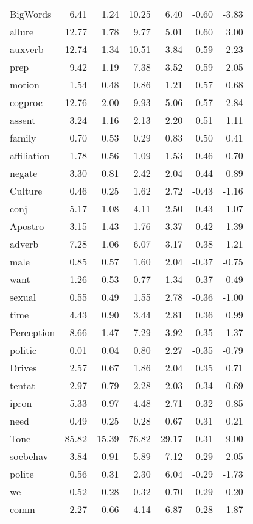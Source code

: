 \begin{longtable}{@{}p{3.4cm}rrrrrr@{}}
BigWords & 6.41 & 1.24 & 10.25 & 6.40 & -0.60 & -3.83 \\
allure & 12.77 & 1.78 & 9.77 & 5.01 & 0.60 & 3.00 \\
auxverb & 12.74 & 1.34 & 10.51 & 3.84 & 0.59 & 2.23 \\
prep & 9.42 & 1.19 & 7.38 & 3.52 & 0.59 & 2.05 \\
motion & 1.54 & 0.48 & 0.86 & 1.21 & 0.57 & 0.68 \\
cogproc & 12.76 & 2.00 & 9.93 & 5.06 & 0.57 & 2.84 \\
assent & 3.24 & 1.16 & 2.13 & 2.20 & 0.51 & 1.11 \\
family & 0.70 & 0.53 & 0.29 & 0.83 & 0.50 & 0.41 \\
affiliation & 1.78 & 0.56 & 1.09 & 1.53 & 0.46 & 0.70 \\
negate & 3.30 & 0.81 & 2.42 & 2.04 & 0.44 & 0.89 \\
Culture & 0.46 & 0.25 & 1.62 & 2.72 & -0.43 & -1.16 \\
conj & 5.17 & 1.08 & 4.11 & 2.50 & 0.43 & 1.07 \\
Apostro & 3.15 & 1.43 & 1.76 & 3.37 & 0.42 & 1.39 \\
adverb & 7.28 & 1.06 & 6.07 & 3.17 & 0.38 & 1.21 \\
male & 0.85 & 0.57 & 1.60 & 2.04 & -0.37 & -0.75 \\
want & 1.26 & 0.53 & 0.77 & 1.34 & 0.37 & 0.49 \\
sexual & 0.55 & 0.49 & 1.55 & 2.78 & -0.36 & -1.00 \\
time & 4.43 & 0.90 & 3.44 & 2.81 & 0.36 & 0.99 \\
Perception & 8.66 & 1.47 & 7.29 & 3.92 & 0.35 & 1.37 \\
politic & 0.01 & 0.04 & 0.80 & 2.27 & -0.35 & -0.79 \\
Drives & 2.57 & 0.67 & 1.86 & 2.04 & 0.35 & 0.71 \\
tentat & 2.97 & 0.79 & 2.28 & 2.03 & 0.34 & 0.69 \\
ipron & 5.33 & 0.97 & 4.48 & 2.71 & 0.32 & 0.85 \\
need & 0.49 & 0.25 & 0.28 & 0.67 & 0.31 & 0.21 \\
Tone & 85.82 & 15.39 & 76.82 & 29.17 & 0.31 & 9.00 \\
socbehav & 3.84 & 0.91 & 5.89 & 7.12 & -0.29 & -2.05 \\
polite & 0.56 & 0.31 & 2.30 & 6.04 & -0.29 & -1.73 \\
we & 0.52 & 0.28 & 0.32 & 0.70 & 0.29 & 0.20 \\
comm & 2.27 & 0.66 & 4.14 & 6.87 & -0.28 & -1.87 \\

\end{longtable}
